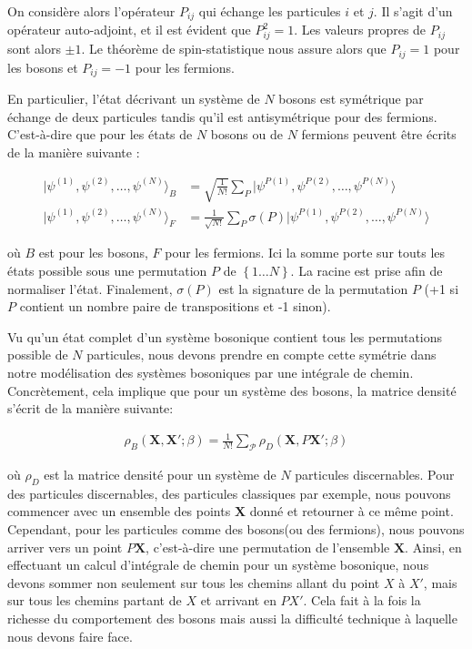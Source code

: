 \documentclass[11pt]{article}
\theoremstyle{definition}
\theoremstyle{remark}
\begin{document}
On considère alors l'opérateur $P_{ij}$ qui échange les particules $i$ et $j$. Il s'agit d'un opérateur auto-adjoint, et il est évident que $P_{ij}^2=1$. Les valeurs propres de $P_{ij}$ sont alors $\pm 1$. Le théorème de spin-statistique nous assure alors que $P_{ij}=1$ pour les bosons et $P_{ij}=-1$ pour les fermions.

En particulier, l’état décrivant un système de $N$ bosons est symétrique par échange de deux particules tandis qu'il est antisymétrique pour des fermions. C'est-à-dire que pour les états de $N$ bosons ou de $N$ fermions peuvent être écrits de la manière suivante : 

\begin{align} 
\label{symetrie_boson_fermion}
|\psi^{(1)},\psi^{(2)},\ldots,\psi^{(N)}\rangle_B &= \sqrt{\frac{1}{N!}} \sum_P |\psi^{P(1)},\psi^{P(2)},\ldots,\psi^{P(N)}\rangle \\
|\psi^{(1)},\psi^{(2)},\ldots,\psi^{(N)}\rangle_F &= \frac{1}{\sqrt{N!}} \sum_P \sigma (P) |\psi^{P(1)},\psi^{P(2)},\ldots,\psi^{P(N)}\rangle
\end{align}

où $B$ est pour les bosons, $F$ pour les fermions. Ici la somme porte sur touts les états possible sous une permutation $P$ de $\left\lbrace 1\ldots N\right\rbrace$. La racine est prise afin de normaliser l'état. Finalement, $\sigma (P)$ est la signature de la permutation $P$ (+1 si $P$ contient un nombre paire de transpositions et -1 sinon). 

Vu qu'un état complet d'un système bosonique contient tous les permutations possible de $N$ particules, nous devons prendre en compte cette symétrie dans notre modélisation des systèmes bosoniques par une intégrale de chemin. Concrètement, cela implique que pour un système des bosons, la matrice densité s'écrit de la manière suivante: 

\begin{align} 
\label{densite_boson}
\rho_{B}( \mathbf{X}, \mathbf{X}'; \beta) = \frac{1}{N!}\sum_{\mathcal{P}} \rho_{D} (\mathbf{X}, P \mathbf{X}'; \beta)
\end{align}

où $\rho_{D}$ est la matrice densité pour un système de $N$ particules discernables. Pour des particules discernables, des particules classiques par exemple, nous pouvons commencer avec un ensemble des points $\mathbf{X}$ donné et retourner à ce même point. Cependant, pour les particules comme des bosons(ou des fermions), nous pouvons arriver vers un point $P\mathbf{X}$, c'est-à-dire une permutation de l'ensemble $\mathbf{X}$. Ainsi, en effectuant un calcul d’intégrale de chemin pour un système bosonique, nous devons sommer non seulement sur tous les chemins allant du point $X$ à $X'$, mais sur tous les chemins partant de $X$ et arrivant en $PX'$. Cela fait à la fois la richesse du comportement des bosons mais aussi la difficulté technique à laquelle nous devons faire face. 
\end{document}
